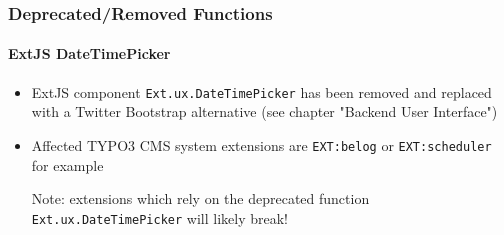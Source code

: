 
\begin{frame}[fragile]
	\frametitle{Deprecated/Removed Functions}
	\framesubtitle{ExtJS DateTimePicker}

	\begin{itemize}

		\item ExtJS component \texttt{Ext.ux.DateTimePicker} has been removed and replaced
			with a Twitter Bootstrap alternative (see chapter "Backend User Interface")

		\item Affected TYPO3 CMS system extensions are \texttt{EXT:belog} or
			\texttt{EXT:scheduler} for example

			\vspace{0.2cm}

			\begingroup
				\color{red}
					Note: extensions which rely on the deprecated function
					\texttt{Ext.ux.DateTimePicker} will likely break!
			\endgroup

	\end{itemize}

\end{frame}


